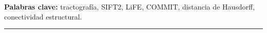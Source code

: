 \documentclass[11pt,a4paper]{article}
\begin{document}
\begin{center}
\begin{minipage}{0.9\textwidth}


\medskip
\textbf{Palabras clave:} tractografía, SIFT2, LiFE, COMMIT, distancia de Hausdorff, conectividad estructural.
\end{minipage}
\end{center}

\vspace{0.4em}
{\color{cimatblue}\rule{\textwidth}{0.6pt}}

\end{document}
